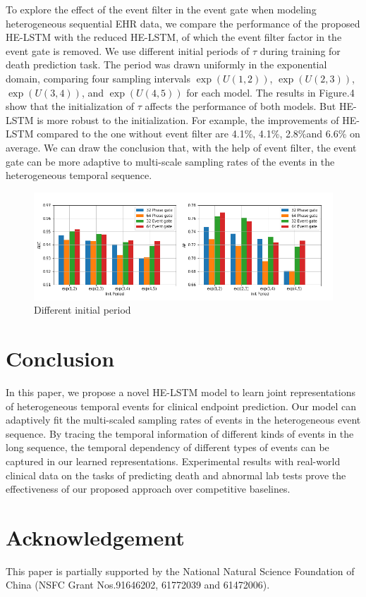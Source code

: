 \documentclass[letterpaper]{article} %
\begin{document}
To explore the effect of the event filter in the event gate when modeling heterogeneous sequential EHR data, we compare the performance of the proposed HE-LSTM with the reduced HE-LSTM, of which the event filter factor in the event gate is removed. 
We use different initial periods of $\tau$ during training for death prediction task.
The period  was drawn uniformly in the exponential
domain, comparing four sampling intervals $\exp(U(1, 2))$, $\exp(U(2, 3))$, $\exp(U(3, 4))$, and
$\exp(U(4, 5))$ for each model. 
The results in Figure.4 show that the initialization of $\tau$ affects the performance of both models. But HE-LSTM is more robust to the initialization. For example, the improvements of HE-LSTM compared to the one without event filter are 4.1\%, 4.1\%, 2.8\%and 6.6\% on average.
We can draw the conclusion that, with the help of event filter, the event gate can be more adaptive to multi-scale sampling rates of the events in the heterogeneous temporal sequence. 

\begin{figure}[!t]
\centering
\includegraphics[width=1.09\linewidth]{init_period.png}

\caption{Different initial period}

\label{fig:period}
\end{figure}







\section{Conclusion}
In this paper, we propose a novel HE-LSTM model
to learn joint representations of heterogeneous temporal events for clinical endpoint prediction.
Our model can adaptively fit the multi-scaled sampling rates of events in the heterogeneous event sequence. By tracing the temporal information of different kinds of events in the long sequence, the temporal dependency of different types of events can be captured in our learned representations. 
Experimental results with real-world clinical data on the tasks of predicting death and abnormal lab tests prove the effectiveness of our proposed approach over competitive baselines. 

\section{Acknowledgement}
This paper is partially supported by the National Natural Science Foundation of China (NSFC Grant Nos.91646202, 61772039 and 61472006). 




\end{document}
